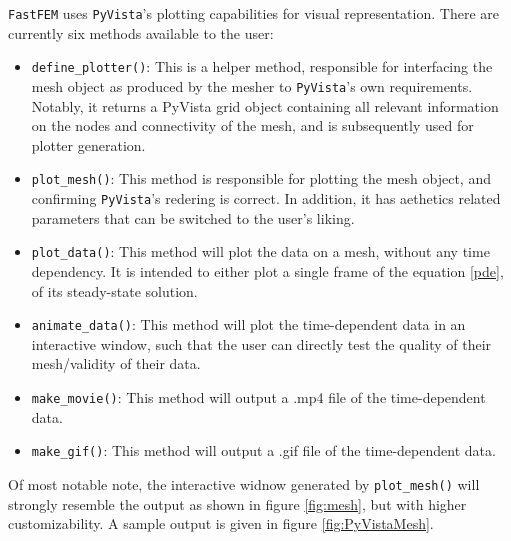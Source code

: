 
\texttt{FastFEM} uses \texttt{PyVista}'s plotting capabilities for visual representation. There are currently six methods available to the user:

\begin{itemize}
    \item \texttt{define\_plotter()}: This is a helper method, responsible for interfacing the mesh object as produced by the mesher to \texttt{PyVista}'s own requirements. Notably, it returns a PyVista grid object containing all relevant information on the nodes and connectivity of the mesh, and is subsequently used for plotter generation.
    \item \texttt{plot\_mesh()}: This method is responsible for plotting the mesh object, and confirming \texttt{PyVista}'s redering is correct. In addition, it has aethetics related parameters that can be switched to the user's liking.
    \item \texttt{plot\_data()}: This method will plot the data on a mesh, without any time dependency. It is intended to either plot a single frame of the equation \ref{pde}, of its steady-state solution.
    \item \texttt{animate\_data()}: This method will plot the time-dependent data in an interactive window, such that the user can directly test the quality of their mesh/validity of their data.
    \item \texttt{make\_movie()}: This method will output a .mp4 file of the time-dependent data.
    \item \texttt{make\_gif()}: This method will output a .gif file of the time-dependent data.
\end{itemize}

Of most notable note, the interactive widnow generated by \texttt{plot\_mesh()} will strongly resemble the output as shown in figure \ref{fig:mesh}, but with higher customizability. A sample output is given in figure \ref{fig:PyVistaMesh}.

